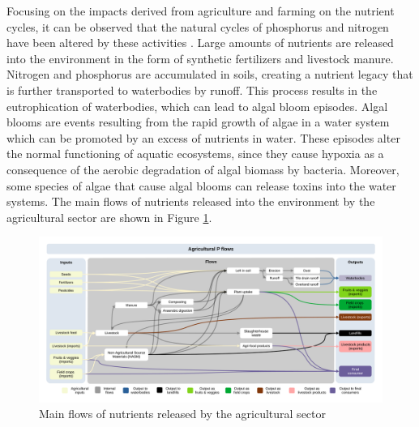\begin{refsection}[referencesCh1]
Focusing on the impacts derived from agriculture and farming on the nutrient cycles, it can be observed that the natural cycles of phosphorus and nitrogen have been altered by these activities \citep{Bouwman2009}. Large amounts of nutrients are released into the environment in the form of synthetic fertilizers and livestock manure. Nitrogen and phosphorus are accumulated in soils, creating a nutrient legacy that is further transported to waterbodies by runoff. This process results in the eutrophication of waterbodies, which can lead to algal bloom episodes. Algal blooms are events resulting from the rapid growth of algae in a water system which can be promoted by an excess of nutrients in water. These episodes alter the normal functioning of aquatic ecosystems, since
they cause hypoxia as a consequence of the aerobic degradation of algal biomass by bacteria. Moreover, some species of algae that cause algal blooms can release toxins into the water systems. The main flows of nutrients released into the environment by the agricultural sector are shown in Figure \ref{fig:Ch1NutrientsFlow}. 

\begin{figure}
	\includegraphics[width=\textwidth, trim=0cm 0cm 0cm 0cm, clip]{gfx/Chapter1/Agriculturalflows.pdf}
	
	\caption{Main flows of nutrients released by the agricultural sector}
	\label{fig:Ch1NutrientsFlow}
\end{figure}


\end{refsection}
